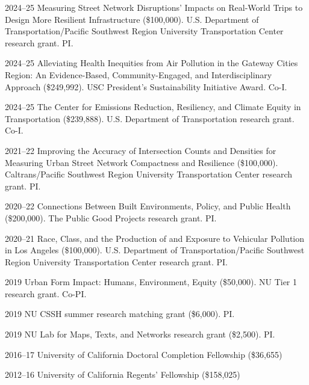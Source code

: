 \documentclass[11pt,letterpaper]{report} %
\begin{document}
    \begin{tablist}

        \item[2024--25] \tab{}Measuring Street Network Disruptions' Impacts on Real-World Trips to Design More Resilient Infrastructure (\$100,000). U.S. Department of Transportation/Pacific Southwest Region University Transportation Center research grant. PI\@.

        \item[2024--25] \tab{}Alleviating Health Inequities from Air Pollution in the Gateway Cities Region: An Evidence-Based, Community-Engaged, and Interdisciplinary Approach (\$249,992). USC President's Sustainability Initiative Award. Co-I\@.

        \item[2024--25] \tab{}The Center for Emissions Reduction, Resiliency, and Climate Equity in Transportation (\$239,888). U.S. Department of Transportation research grant. Co-I\@.

        \item[2021--22] \tab{}Improving the Accuracy of Intersection Counts and Densities for Measuring Urban Street Network Compactness and Resilience (\$100,000). Caltrans/Pacific Southwest Region University Transportation Center research grant. PI\@.

        \item[2020--22] \tab{}Connections Between Built Environments, Policy, and Public Health (\$200,000). The Public Good Projects research grant. PI\@.

        \item[2020--21] \tab{}Race, Class, and the Production of and Exposure to Vehicular Pollution in Los Angeles (\$100,000). U.S. Department of Transportation/Pacific Southwest Region University Transportation Center research grant. PI\@.

        \item[2019] \tab{}Urban Form Impact: Humans, Environment, Equity (\$50,000). NU Tier 1 research grant. Co-PI\@.

        \item[2019] \tab{}NU CSSH summer research matching grant (\$6,000). PI\@.

        \item[2019] \tab{}NU Lab for Maps, Texts, and Networks research grant (\$2,500). PI\@.

        \item[2016--17] \tab{}University of California Doctoral Completion Fellowship (\$36,655)

        \item[2012--16] \tab{}University of California Regents' Fellowship (\$158,025)

    \end{tablist}
\end{document}
